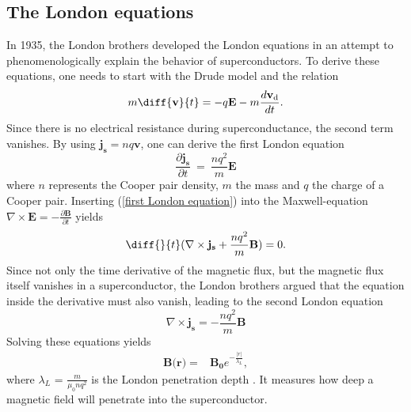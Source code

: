 \subsection{The London equations}
In 1935, the London brothers developed the London equations in an attempt to phenomenologically explain the behavior of superconductors. To derive these equations, one needs to start with the Drude model and the relation 
\begin{equation}
    m\diff{\textbf{v}}{t} = -q\textbf{E} - m\frac{d\mathbf{v_{\textrm{d}}}}{dt}.
\end{equation}
Since there is no electrical resistance during superconductance, the second term vanishes. By using $\mathbf{j_s} = n q \textbf{v}$, one can derive the first London equation \cite{Hunklinger2018}
\begin{equation}
    \frac{\partial\mathbf{j_s}}{\partial t} \ = \  \frac{nq^2}{m}\textbf{E} 
    \label{first London equation}
\end{equation}
where $n$ represents the Cooper pair density, $m$ the mass and $q$ the charge of a Cooper pair.
Inserting (\ref{first London equation}) into the Maxwell-equation $\nabla \times \mathbf{E} = -\frac{\partial \mathbf{B}}{\partial t}$ yields
\begin{equation}
    \diff{}{t}(\nabla \times \mathbf{j_s} + \frac{nq^2}{m}\textbf{B}) = 0.
    \label{d/dt of second london equation}
\end{equation}
Since not only the time derivative of the magnetic flux, but the magnetic flux itself vanishes in a superconductor, the London brothers argued that the equation inside the derivative must also vanish, leading to the second London equation \cite{Hunklinger2018}
\begin{equation} 
    \nabla \times \mathbf{j_s} = -\frac{nq^2}{m}\textbf{B}
    \label{second London equation}
\end{equation}
Solving these equations yields 
\begin{align}
    \mathbf{B(}\textbf{r}) =& \mathbf{B_\textrm{0}}e^{-\frac{|r|}{\lambda_L}},
\end{align}
where $\lambda_L$ = $\frac{m}{\mu_0 nq^2}$ is the London penetration depth \cite{Mueller2019}. It measures how deep a magnetic field will penetrate into the superconductor. 

